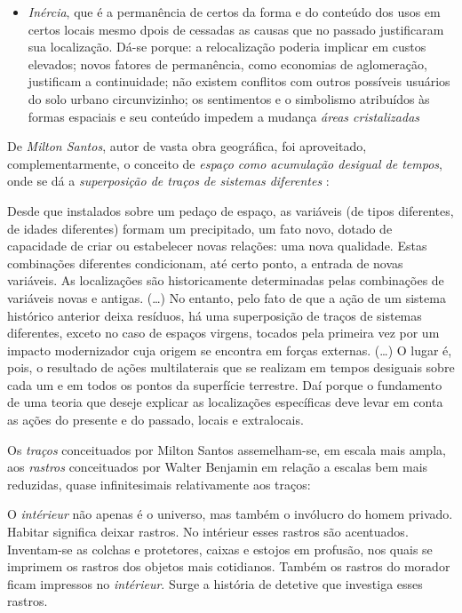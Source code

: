 \begin{itemize}
\item \textit{Inércia}, que é a permanência de certos da forma e do conteúdo dos usos em certos locais mesmo dpois de cessadas as causas que no passado justificaram sua localização. Dá-se porque: a relocalização poderia implicar em custos elevados; novos fatores de permanência, como economias de aglomeração, justificam a continuidade; não existem conflitos com outros possíveis usuários do solo urbano circunvizinho; os sentimentos e o simbolismo atribuídos às formas espaciais e seu conteúdo impedem a mudança \textit{áreas cristalizadas}\cite[p.~76-79]{CORREA1985espa}
\end{itemize}

De \textit{Milton Santos}, autor de vasta obra geográfica, foi aproveitado, complementarmente, o conceito de \textit{espaço como acumulação desigual de tempos}, onde se dá a \textit{superposição de traços de sistemas diferentes} \cite[p.~256-257]{SANTOS2008}:

\begin{citacao}
Desde que instalados sobre um pedaço de espaço, as variáveis (de tipos diferentes, de idades diferentes) formam um precipitado, um fato novo, dotado de capacidade de criar ou estabelecer novas relações: uma nova qualidade. Estas combinações diferentes condicionam, até certo ponto, a entrada de novas variáveis. As localizações são historicamente determinadas pelas combinações de variáveis novas e antigas. (…) No entanto, pelo fato de que a ação de um sistema histórico anterior deixa resíduos, há uma superposição de traços de sistemas diferentes, exceto no caso de espaços virgens, tocados pela primeira vez por um impacto modernizador cuja origem se encontra em forças externas. (…) O lugar é, pois, o resultado de ações multilaterais que se realizam em tempos desiguais sobre cada um e em todos os pontos da superfície terrestre. Daí porque o fundamento de uma teoria que deseje explicar as localizações específicas deve levar em conta as ações do presente e do passado, locais e extralocais. \cite[p.~256-258]{SANTOS2008}
\end{citacao}

Os \textit{traços} conceituados por Milton Santos assemelham-se, em escala mais ampla, aos \textit{rastros} conceituados por Walter Benjamin em relação a escalas bem mais reduzidas, quase infinitesimais relativamente aos traços:

\begin{citacao}
O \textit{intérieur} não apenas é o universo, mas também o invólucro do homem privado. Habitar significa deixar rastros. No intérieur esses rastros são acentuados. Inventam-se as colchas e protetores, caixas e estojos em profusão, nos quais se imprimem os rastros dos objetos mais cotidianos. Também os rastros do morador ficam impressos no \textit{intérieur}. Surge a história de detetive que investiga esses rastros. \cite[p.~46]{benjamin_passagens_2006}
\end{citacao}


